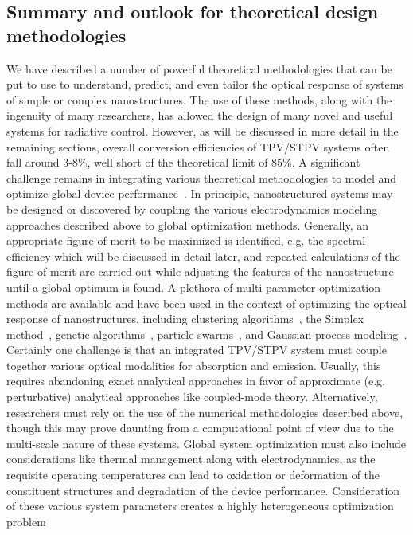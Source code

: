 \documentclass[review]{elsarticle}
\begin{document}
\subsection{Summary and outlook for theoretical design methodologies}
We have described a number of powerful theoretical methodologies that can be put to use to understand, predict, and even tailor the optical
response of systems of simple or complex nanostructures.  The use of these methods, along with the ingenuity of many researchers, has
allowed the design of many novel and useful systems for radiative control.  However, as will be discussed in more detail in the remaining sections, 
overall conversion efficiencies of TPV/STPV systems often fall around 3-8\%,  well short of the theoretical limit of 85\%.  A significant challenge remains in integrating
various theoretical methodologies to model and optimize global device performance~\cite{g4,g9}.
In principle, nanostructured systems may be designed or discovered by coupling the various electrodynamics modeling approaches described above 
to global optimization methods.  Generally, an appropriate figure-of-merit to be maximized is identified, e.g. the spectral efficiency which will
be discussed in detail later, and repeated calculations of the figure-of-merit are carried out while adjusting the features of the nanostructure until 
a global optimum is found.  A plethora of multi-parameter optimization methods are available and have been used in the context of optimizing the 
optical response of nanostructures, including clustering algorithms~\cite{g4}, the Simplex method~\cite{Simplex, CH_APL_2006}, genetic algorithms~\cite{ga,DB_JApplPhys_2007}, 
particle swarms~\cite{NDJ_JApplPhys_2012, ParticleSwarm}, and Gaussian
process modeling~\cite{miller1}.  Certainly one
challenge is that an integrated TPV/STPV system must couple together various optical modalities for absorption and emission.  Usually, this requires
abandoning exact analytical approaches in favor of approximate (e.g. perturbative) analytical approaches like coupled-mode theory.  Alternatively,
researchers must rely on the use of the numerical methodologies described above, 
though this may
prove daunting from a computational point of view due to the multi-scale nature of these systems.
Global system optimization must also include considerations like thermal management along with electrodynamics, as the
requisite operating temperatures can lead to oxidation or deformation of the
constituent structures and degradation of the device performance.  
Consideration of these various system parameters creates a highly heterogeneous optimization problem
\end{document}
